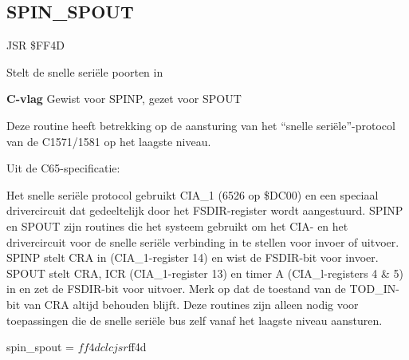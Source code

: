 \subsection{SPIN{\_}SPOUT}
\label{KERNAL Jump Table!SPIN_SPOUT}
\begin{description}[leftmargin=2cm,style=nextline]
    \item [Adres:] JSR \$FF4D    \item [Omschrijving:] Stelt de snelle seriële poorten in    \item [Invoer:]        \textbf{C-vlag} Gewist voor SPINP, gezet voor SPOUT    \item [Opmerkingen:]    Deze routine heeft betrekking op de aansturing van het ``snelle seriële''-protocol van de C1571/1581 op het laagste niveau.

    Uit de C65-specificatie:

    Het snelle seriële protocol gebruikt CIA\_1 (6526 op \$DC00) en een speciaal drivercircuit dat gedeeltelijk door het FSDIR-register wordt aangestuurd. SPINP en SPOUT zijn routines die het systeem gebruikt om het CIA- en het drivercircuit voor de snelle seriële verbinding in te stellen voor invoer of uitvoer. SPINP stelt CRA in (CIA\_1-register 14) en wist de FSDIR-bit voor invoer. SPOUT stelt CRA, ICR (CIA\_1-register 13) en timer A (CIA\_l-registers 4 \& 5) in en zet de FSDIR-bit voor uitvoer. Merk op dat de toestand van de TOD\_IN-bit van CRA altijd behouden blijft. Deze routines zijn alleen nodig voor toepassingen die de snelle seriële bus zelf vanaf het laagste niveau aansturen.    \item [Voorbeeld:]
        \begin{asmcode}
spin_spout = $ff4d

    clc
    jsr $ff4d
        \end{asmcode}
\end{description}



\newpage
